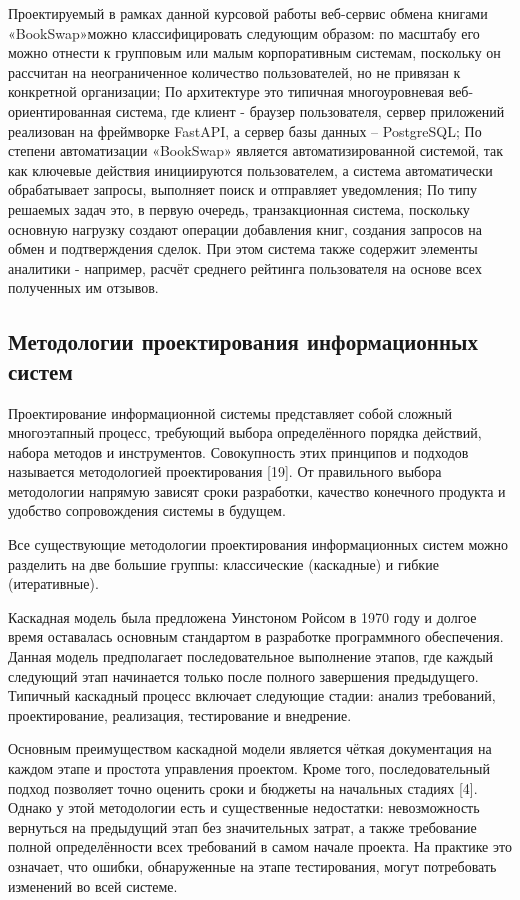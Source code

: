 \documentclass[14pt,a4paper]{extarticle}
\begin{document}
Проектируемый в рамках данной курсовой работы веб-сервис обмена книгами
«BookSwap»можно классифицировать следующим образом: по масштабу его
можно отнести к групповым или малым корпоративным системам, поскольку он
рассчитан на неограниченное количество пользователей, но не привязан к
конкретной организации; По архитектуре это типичная многоуровневая
веб-ориентированная система, где клиент - браузер пользователя, сервер
приложений реализован на фреймворке FastAPI, а сервер базы данных --
PostgreSQL; По степени автоматизации «BookSwap» является
автоматизированной системой, так как ключевые действия инициируются
пользователем, а система автоматически обрабатывает запросы, выполняет
поиск и отправляет уведомления; По типу решаемых задач это, в первую
очередь, транзакционная система, поскольку основную нагрузку создают
операции добавления книг, создания запросов на обмен и подтверждения
сделок. При этом система также содержит элементы аналитики - например,
расчёт среднего рейтинга пользователя на основе всех полученных им
отзывов.

\subsection{Методологии проектирования информационных систем}

Проектирование информационной системы представляет собой сложный
многоэтапный процесс, требующий выбора определённого порядка действий,
набора методов и инструментов. Совокупность этих принципов и подходов
называется методологией проектирования [19]. От правильного выбора
методологии напрямую зависят сроки разработки, качество конечного
продукта и удобство сопровождения системы в будущем.

Все существующие методологии проектирования информационных систем можно
разделить на две большие группы: классические (каскадные) и гибкие
(итеративные).

Каскадная модель была предложена Уинстоном Ройсом в 1970 году и долгое
время оставалась основным стандартом в разработке программного
обеспечения. Данная модель предполагает последовательное выполнение
этапов, где каждый следующий этап начинается только после полного
завершения предыдущего. Типичный каскадный процесс включает следующие
стадии: анализ требований, проектирование, реализация, тестирование и
внедрение.

Основным преимуществом каскадной модели является чёткая документация на
каждом этапе и простота управления проектом. Кроме того,
последовательный подход позволяет точно оценить сроки и бюджеты на
начальных стадиях [4]. Однако у этой методологии есть и существенные
недостатки: невозможность вернуться на предыдущий этап без значительных
затрат, а также требование полной определённости всех требований в самом
начале проекта. На практике это означает, что ошибки, обнаруженные на
этапе тестирования, могут потребовать изменений во всей системе.
\end{document}
